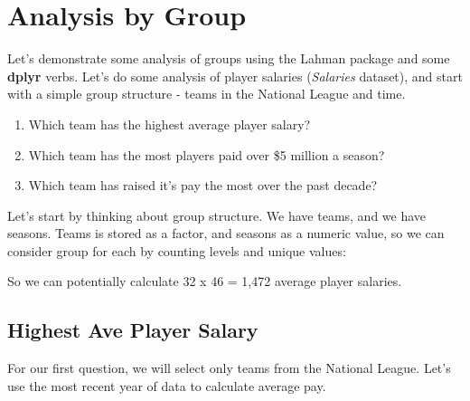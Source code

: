 \documentclass[]{book}
\newenvironment{Shaded}{\begin{snugshade}}{\end{snugshade}}
\newcommand{\CommentTok}[1]{\textcolor[rgb]{0.56,0.35,0.01}{\textit{#1}}}
\newcommand{\KeywordTok}[1]{\textcolor[rgb]{0.13,0.29,0.53}{\textbf{#1}}}
\newcommand{\NormalTok}[1]{#1}
\newcommand{\OperatorTok}[1]{\textcolor[rgb]{0.81,0.36,0.00}{\textbf{#1}}}
\providecommand{\tightlist}{%
  \setlength{\itemsep}{0pt}\setlength{\parskip}{0pt}}
\theoremstyle{definition}
\theoremstyle{definition}
\theoremstyle{definition}
\theoremstyle{remark}
\begin{document}
\hypertarget{analysis-by-group}{%
\section{Analysis by Group}\label{analysis-by-group}}

Let's demonstrate some analysis of groups using the Lahman package and
some \textbf{dplyr} verbs. Let's do some analysis of player salaries
(\emph{Salaries} dataset), and start with a simple group structure -
teams in the National League and time.

\begin{enumerate}
\def\labelenumi{\arabic{enumi}.}
\tightlist
\item
  Which team has the highest average player salary?
\item
  Which team has the most players paid over \$5 million a season?
\item
  Which team has raised it's pay the most over the past decade?
\end{enumerate}

Let's start by thinking about group structure. We have teams, and we
have seasons. Teams is stored as a factor, and seasons as a numeric
value, so we can consider group for each by counting levels and unique
values:

\begin{Shaded}
\end{Shaded}

So we can potentially calculate 32 x 46 = 1,472 average player salaries.

\hypertarget{highest-ave-player-salary}{%
\subsection{Highest Ave Player Salary}\label{highest-ave-player-salary}}

For our first question, we will select only teams from the National
League. Let's use the most recent year of data to calculate average pay.
\end{document}
